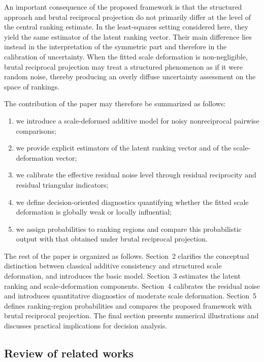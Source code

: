 \documentclass[11pt]{amsart}
\theoremstyle{definition}
\theoremstyle{plain}
\numberwithin{equation}{section}
\begin{document}
An important consequence of the proposed framework is that the structured approach and brutal reciprocal projection do not primarily differ at the level of the central ranking estimate. In the least-squares setting considered here, they yield the same estimator of the latent ranking vector. Their main difference lies instead in the interpretation of the symmetric part and therefore in the calibration of uncertainty. When the fitted scale deformation is non-negligible, brutal reciprocal projection may treat a structured phenomenon as if it were random noise, thereby producing an overly diffuse uncertainty assessment on the space of rankings.

The contribution of the paper may therefore be summarized as follows:
\begin{enumerate}
\item we introduce a scale-deformed additive model for noisy nonreciprocal pairwise comparisons;
\item we provide explicit estimators of the latent ranking vector and of the scale-deformation vector;
\item we calibrate the effective residual noise level through residual reciprocity and residual triangular indicators;
\item we define decision-oriented diagnostics quantifying whether the fitted scale deformation is globally weak or locally influential;
\item we assign probabilities to ranking regions and compare this probabilistic output with that obtained under brutal reciprocal projection.
\end{enumerate}

The rest of the paper is organized as follows. Section~2 clarifies the conceptual distinction between classical additive consistency and structured scale deformation, and introduces the basic model. Section~3 estimates the latent ranking and scale-deformation components. Section~4 calibrates the residual noise and introduces quantitative diagnostics of moderate scale deformation. Section~5 defines ranking-region probabilities and compares the proposed framework with brutal reciprocal projection. The final section presents numerical illustrations and discusses practical implications for decision analysis.

\subsection*{Review of related works}
\end{document}
